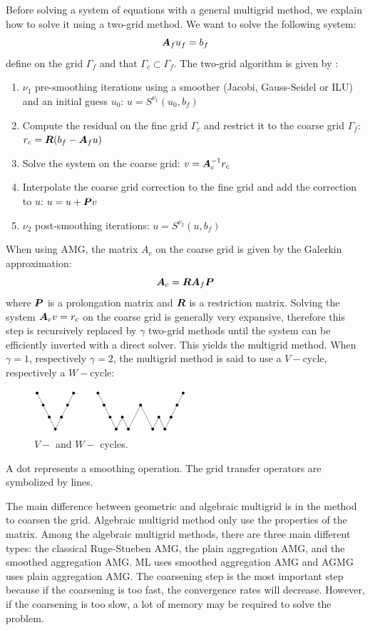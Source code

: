 Before solving a system of equations with a general multigrid method, we
explain how to solve it using a two-grid method. We want to
solve the following system:
\begin{equation}
  \boldsymbol{A}_f u_f = b_f
\end{equation}
define on the grid $\Gamma_f$ and that $\Gamma_c \subset \Gamma_f$. The 
two-grid algorithm is given by :
\begin{enumerate}
  \item $\nu_1$ pre-smoothing iterations using a smoother (Jacobi,
    Gauss-Seidel or ILU) and an initial guess $u_0$: $u = S^{\nu_1}(u_0,b_f)$
  \item Compute the residual on the fine grid $\Gamma_c$ and restrict it to
    the coarse grid $\Gamma_f$: $r_c = \boldsymbol{R}(b_f-\boldsymbol{A}_f u)$
  \item Solve the system on the coarse grid: $v=\boldsymbol{A}_c^{-1} r_c$
  \item Interpolate the coarse grid correction to the fine grid and add the
    correction to $u$: $u=u+\boldsymbol{P}v$
  \item $\nu_2$ post-smoothing iterations: $u = S^{\nu_2}(u,b_f)$
\end{enumerate}
When using AMG, the matrix $A_c$ on the coarse grid is given by the Galerkin
approximation:
\begin{equation}
  \boldsymbol{A}_c = \boldsymbol{R}\boldsymbol{A}_f \boldsymbol{P}
\end{equation}
where $\boldsymbol{P}$ is a prolongation matrix and $\boldsymbol{R}$ is a restriction matrix.
Solving the system $\boldsymbol{A}_c v = r_c$ on the coarse grid is generally very
expansive, therefore this step is recursively replaced by $\gamma$ two-grid
methods until the system can be efficiently inverted with a direct solver.
This yields the multigrid method. When $\gamma = 1$, respectively $\gamma =
2$, the multigrid method is said to use a $V-$cycle, respectively a $W-$cycle:
\begin{figure}[H]
  \centering
  \includegraphics[width=0.5\textwidth]{./Dsa/v_w_cycles}
  \caption{$V-$ and $W-$ cycles.}
\end{figure}
A dot represents a smoothing operation. The grid transfer operators are 
symbolized by lines.

The main difference between geometric and algebraic multigrid is in the method
to coarsen the grid. Algebraic multigrid method only use the properties of the
matrix. Among the algebraic multigrid methods, there are three main different 
types: the classical Ruge-Stueben AMG, the plain aggregation AMG, and the
smoothed aggregation AMG. ML uses smoothed aggregation AMG and AGMG
uses plain aggregation AMG.  The coarsening step is the most important 
step because if the coarsening is too fast, the convergence rates will 
decrease. However, if the coarsening is too slow, a lot of memory may be 
required to solve the problem. 

